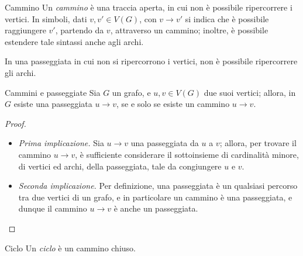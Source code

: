 \documentclass[a4paper, 12pt]{report}
\begin{document}
    \begin{frameddefn}{Cammino}
        Un \textit{cammino} è una traccia aperta, in cui non è possibile ripercorrere i vertici. In simboli, dati $v, v' \in V(G)$, con $v \rightarrow v'$ si indica che è possibile raggiungere $v'$, partendo da $v$, attraverso un cammino; inoltre, è possibile estendere tale sintassi anche agli archi.
    \end{frameddefn}

    \begin{framedobs}{}
        In una passeggiata in cui non si ripercorrono i vertici, non è possibile ripercorrere gli archi.
    \end{framedobs}

    \begin{framedthm}{Cammini e passeggiate}
        \label{cammini e passeggiate}
        Sia $G$ un grafo, e $u, v \in V(G)$ due suoi vertici; allora, in $G$ esiste una passeggiata $u \rightarrow v$, se e solo se esiste un cammino $u \rightarrow v$.
    \end{framedthm}

    \begin{proof}
        \hspace{0.7cm}
        \begin{itemize}
            \item[] \textit{Prima implicazione.} Sia $u \rightarrow v$ una passeggiata da $u$ a $v$; allora, per trovare il cammino $u \rightarrow v$, è sufficiente considerare il sottoinsieme di cardinalità minore, di vertici ed archi, della passeggiata, tale da congiungere $u$ e $v$.
            \item[] \textit{Seconda implicazione.} Per definizione, una passeggiata è un qualsiasi percorso tra due vertici di un grafo, e in particolare un cammino è una passeggiata, e dunque il cammino $u \rightarrow v$ è anche un passeggiata.
        \end{itemize}
    \end{proof}

    \begin{frameddefn}{Ciclo}
        Un \textit{ciclo} è un cammino chiuso.
    \end{frameddefn}
\end{document}
